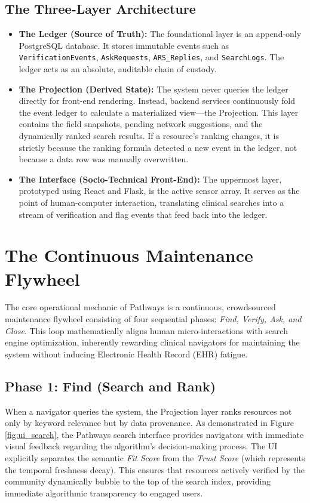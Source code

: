 \documentclass[12pt,oneside]{report}
\begin{document}
\subsection{The Three-Layer Architecture}
\begin{itemize}
    \item \textbf{The Ledger (Source of Truth):} The foundational layer is an append-only PostgreSQL database. It stores immutable events such as \texttt{VerificationEvents}, \texttt{AskRequests}, \texttt{ARS\_Replies}, and \texttt{SearchLogs}. The ledger acts as an absolute, auditable chain of custody. 
    \item \textbf{The Projection (Derived State):} The system never queries the ledger directly for front-end rendering. Instead, backend services continuously fold the event ledger to calculate a materialized view—the Projection. This layer contains the field snapshots, pending network suggestions, and the dynamically ranked search results. If a resource's ranking changes, it is strictly because the ranking formula detected a new event in the ledger, not because a data row was manually overwritten.
    \item \textbf{The Interface (Socio-Technical Front-End):} The uppermost layer, prototyped using React and Flask, is the active sensor array. It serves as the point of human-computer interaction, translating clinical searches into a stream of verification and flag events that feed back into the ledger.
\end{itemize}

\section{The Continuous Maintenance Flywheel}
The core operational mechanic of Pathways is a continuous, crowdsourced maintenance flywheel consisting of four sequential phases: \textit{Find, Verify, Ask, and Close}. This loop mathematically aligns human micro-interactions with search engine optimization, inherently rewarding clinical navigators for maintaining the system without inducing Electronic Health Record (EHR) fatigue. 

\subsection{Phase 1: Find (Search and Rank)}
When a navigator queries the system, the Projection layer ranks resources not only by keyword relevance but by data provenance. As demonstrated in Figure \ref{fig:ui_search}, the Pathways search interface provides navigators with immediate visual feedback regarding the algorithm's decision-making process. The UI explicitly separates the semantic \textit{Fit Score} from the \textit{Trust Score} (which represents the temporal freshness decay). This ensures that resources actively verified by the community dynamically bubble to the top of the search index, providing immediate algorithmic transparency to engaged users.
\end{document}
